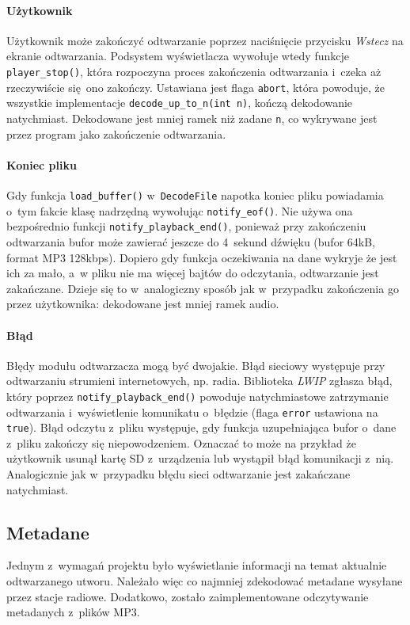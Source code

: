 \documentclass[polish]{aghengthesis}
\begin{document}
			\paragraph{Użytkownik}
				Użytkownik może zakończyć odtwarzanie poprzez naciśnięcie przycisku \textit{Wstecz} na ekranie odtwarzania. Podsystem wyświetlacza wywołuje wtedy funkcje \lstinline|player_stop()|, która rozpoczyna proces zakończenia odtwarzania i~czeka aż rzeczywiście się ono zakończy. Ustawiana jest flaga \lstinline|abort|, która powoduje, że wszystkie implementacje \lstinline|decode_up_to_n(int n)|, kończą dekodowanie natychmiast. Dekodowane jest mniej ramek niż zadane \lstinline|n|, co wykrywane jest przez program jako zakończenie odtwarzania.
			
			\paragraph{Koniec pliku}
				Gdy funkcja \lstinline|load_buffer()| w~\lstinline|DecodeFile| napotka koniec pliku powiadamia o~tym fakcie klasę nadrzędną wywołując \lstinline|notify_eof()|. Nie używa ona bezpośrednio funkcji \lstinline|notify_playback_end()|, ponieważ przy zakończeniu odtwarzania bufor może zawierać jeszcze do 4~sekund dźwięku (bufor 64kB, format MP3 128kbps). Dopiero gdy funkcja oczekiwania na dane wykryje że jest ich za mało, a~w pliku nie ma więcej bajtów do odczytania, odtwarzanie jest zakańczane. Dzieje się to w~analogiczny sposób jak w~przypadku zakończenia go przez użytkownika: dekodowane jest mniej ramek audio.
			
			\paragraph{Błąd}
				Błędy modułu odtwarzacza mogą być dwojakie. Błąd sieciowy występuje przy odtwarzaniu strumieni internetowych, np. radia. Biblioteka \textit{LWIP} zgłasza błąd, który poprzez \lstinline|notify_playback_end()| powoduje natychmiastowe zatrzymanie odtwarzania i~wyświetlenie komunikatu o~błędzie (flaga \lstinline|error| ustawiona na \lstinline|true|). Błąd odczytu z~pliku występuje, gdy funkcja uzupełniająca bufor o~dane z~pliku zakończy się niepowodzeniem. Oznaczać to może na przykład że użytkownik usunął kartę SD z~urządzenia lub wystąpił błąd komunikacji z~nią. Analogicznie jak w~przypadku błędu sieci odtwarzanie jest zakańczane natychmiast.
			
		\subsection{Metadane}
		Jednym z~wymagań projektu było wyświetlanie informacji na temat aktualnie odtwarzanego utworu. Należało więc co najmniej zdekodować metadane wysyłane przez stacje radiowe. Dodatkowo, zostało zaimplementowane odczytywanie metadanych z~plików MP3.
		
\end{document}
